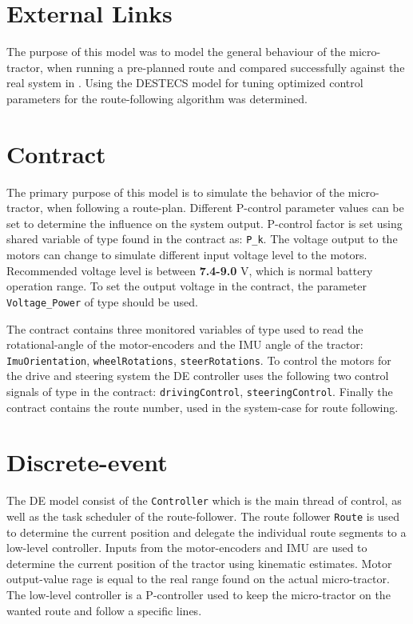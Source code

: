 \section{External Links}
The purpose of this model was to model the general behaviour of the
micro-tractor, when running a pre-planned route and compared
successfully against the real system in \cite{Christiansen&12a}.
Using the DESTECS model for tuning optimized control parameters for
the route-following algorithm was determined.

\section{Contract}
The primary purpose of this model is to simulate the behavior of the
micro-tractor, when following a route-plan.  Different P-control
parameter values can be set to determine the influence on the system
output.  P-control factor is set using shared variable of type
 found in the contract as: \texttt{P\_k}.  The voltage
output to the motors can change to simulate different input voltage
level to the motors.  Recommended voltage level is between
\textbf{7.4-9.0} V, which is normal battery operation range.  To set
the output voltage in the contract, the parameter
\texttt{Voltage\_Power} of type  should be used.

The contract contains three monitored variables of type 
used to read the rotational-angle of the motor-encoders and the IMU
angle of the tractor: \texttt{ImuOrientation},
\texttt{wheelRotations}, \texttt{steerRotations}.  To control the
motors for the drive and steering system the DE controller uses the
following two control signals of type  in the contract:
\texttt{drivingControl}, \texttt{steering\-Control}.  Finally the
contract contains the route number, used in the system-case for route
following.

\section{Discrete-event}
The DE model consist of the \texttt{Controller} which is the main
thread of control, as well as the task scheduler of the
route-follower.  The route follower \texttt{Route} is used to determine the current
position and delegate the individual route segments to a low-level
controller.  Inputs from the motor-encoders and IMU are used to
determine the current position of the tractor using kinematic
estimates.  Motor output-value rage is equal to the real range found
on the actual micro-tractor.  The low-level controller is a
P-controller used to keep the micro-tractor on the wanted route and
follow a specific lines.

